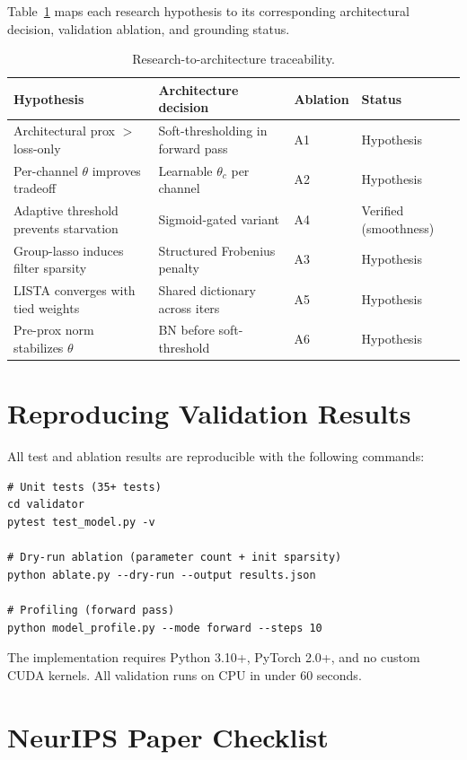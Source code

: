 \documentclass{article}
\begin{document}
Table~\ref{tab:trace} maps each research hypothesis to its corresponding
architectural decision, validation ablation, and grounding status.

\begin{table}[h]
\centering
\caption{Research-to-architecture traceability.}\label{tab:trace}
\small
\begin{tabular}{p{3cm}p{3.5cm}p{2.5cm}p{2cm}}
\toprule
Hypothesis & Architecture decision & Ablation & Status \\
\midrule
Architectural prox $>$ loss-only & Soft-thresholding in forward pass & A1 & Hypothesis \\
Per-channel $\theta$ improves tradeoff & Learnable $\theta_c$ per channel & A2 & Hypothesis \\
Adaptive threshold prevents starvation & Sigmoid-gated variant & A4 & Verified (smoothness) \\
Group-lasso induces filter sparsity & Structured Frobenius penalty & A3 & Hypothesis \\
LISTA converges with tied weights & Shared dictionary across iters & A5 & Hypothesis \\
Pre-prox norm stabilizes $\theta$ & BN before soft-threshold & A6 & Hypothesis \\
\bottomrule
\end{tabular}
\end{table}

\section{Reproducing Validation Results}

All test and ablation results are reproducible with the following commands:

\begin{verbatim}
# Unit tests (35+ tests)
cd validator
pytest test_model.py -v

# Dry-run ablation (parameter count + init sparsity)
python ablate.py --dry-run --output results.json

# Profiling (forward pass)
python model_profile.py --mode forward --steps 10
\end{verbatim}

The implementation requires Python 3.10+, PyTorch 2.0+, and no custom CUDA
kernels. All validation runs on CPU in under 60 seconds.

\newpage
\section*{NeurIPS Paper Checklist}
\end{document}
